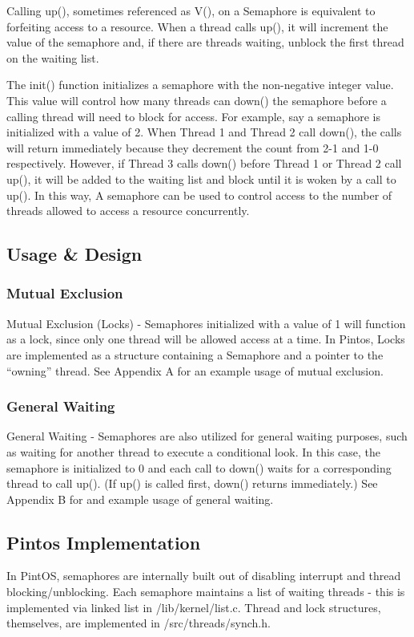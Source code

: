 \documentclass[11pt, letterpaper]{article}
\begin{document}
Calling up(), sometimes referenced as V(), on a Semaphore is equivalent to forfeiting access to a resource. When a thread calls up(), it will increment the value of the semaphore and, if there are threads waiting, unblock the first thread on the waiting list.

The init() function initializes a semaphore with the non-negative integer value. This value will control how many threads can down() the semaphore before a calling thread will need to block for access. For example, say a semaphore is initialized with a value of 2. When Thread 1 and Thread 2 call down(), the calls will return immediately because they decrement the count from 2-1 and 1-0 respectively. However, if Thread 3 calls down() before Thread 1 or Thread 2 call up(), it will be added to the waiting list and block until it is woken by a call to up(). In this way, A semaphore can be used to control access to the number of threads allowed to access a resource concurrently.


\subsection{Usage & Design}

\subsubsection{Mutual Exclusion}
Mutual Exclusion (Locks) - Semaphores initialized with a value of 1 will function as a lock, since only one thread will be allowed access at a time. In Pintos, Locks are implemented as a structure containing a Semaphore and a pointer to the “owning” thread. See Appendix A for an example usage of mutual exclusion.


\subsubsection{General Waiting}
General Waiting - Semaphores are also utilized for general waiting purposes, such as waiting for another thread to execute a conditional look. In this case, the semaphore is initialized to 0 and each call to down() waits for a corresponding thread to call up(). (If up() is called first, down() returns immediately.) See Appendix B for and example usage of general waiting.

\subsection{Pintos Implementation}
In PintOS, semaphores are internally built out of disabling interrupt and thread blocking/unblocking. Each semaphore maintains a list of waiting threads - this is implemented via linked list in /lib/kernel/list.c.
Thread and lock structures, themselves, are implemented in /src/threads/synch.h.
\end{document}
